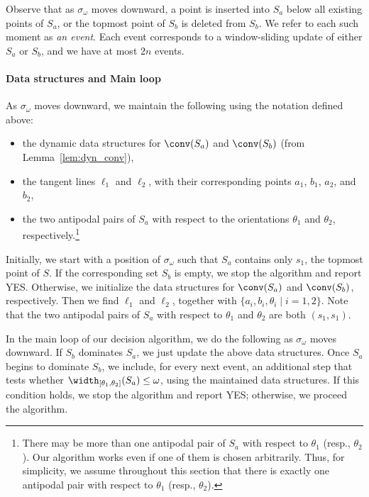 Observe that as $\sigma_\omega$ moves downward, a point is inserted into $S_a$ below all existing points of $S_a$, or the topmost point of $S_b$ is deleted from $S_b$. 
We refer to each such moment as \emph{an event}. 
Each event corresponds to a window-sliding update of either $S_a$ or $S_b$, and we have at most $2n$ events.  

\paragraph*{Data structures and Main loop}
\label{par:ds_mainloop}
As $\sigma_\omega$ moves downward, we maintain the following using the notation defined above:
\begin{itemize}
    \item the dynamic data structures for $\conv(S_a)$ and $\conv(S_b)$ (from Lemma~\ref{lem:dyn_conv}),
    \item the tangent lines $\ell_1$ and $\ell_2$, with their corresponding points $a_1$, $b_1$, $a_2$, and $b_2$,
    \item the two antipodal pairs of $S_a$ with respect to the orientations $\theta_1$ and $\theta_2$, respectively.\footnote{There may be more than one antipodal pair of $S_a$ with respect to $\theta_1$ (resp., $\theta_2$). 
    Our algorithm works even if one of them is chosen arbitrarily. 
    Thus, for simplicity, we assume throughout this section that there is exactly one antipodal pair with respect to $\theta_1$ (resp., $\theta_2$).}
\end{itemize}

Initially, we start with a position of $\sigma_\omega$ such that $S_a$ contains only $s_1$, the topmost point of $S$. 
If the corresponding set $S_b$ is empty, we stop the algorithm and report YES. Otherwise, we initialize the data structures for $\conv(S_a)$ and $\conv(S_b)$, respectively.
Then we find $\ell_1$ and $\ell_2$, together with $\{a_i, b_i, \theta_i \mid i = 1, 2\}$. 
Note that the two antipodal pairs of $S_a$ with respect to $\theta_1$ and $\theta_2$ are both $(s_1, s_1)$.


In the main loop of our decision algorithm, we do the following as $\sigma_\omega$ moves downward.
If $S_b$ dominates $S_a$, we just update the above data structures.  
Once $S_a$ begins to dominate $S_b$, we include, for every next event, an additional step that tests whether $\width_{[\theta_1, \theta_2]}(S_a) \le \omega$, using the maintained data structures. If this condition holds, we stop the algorithm and report YES; otherwise, we proceed the algorithm. 

